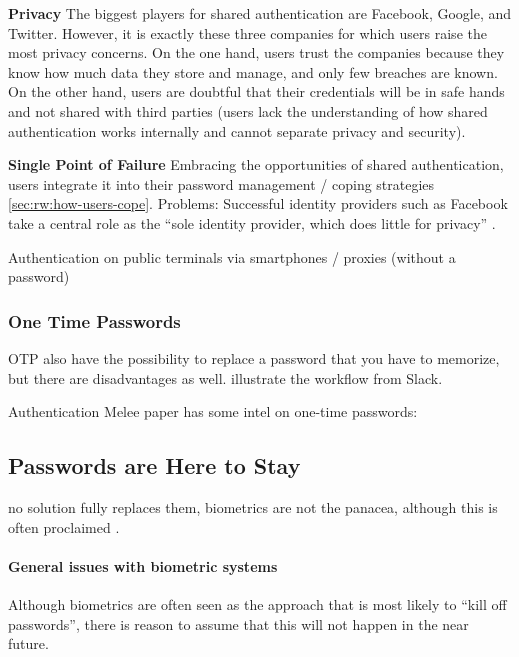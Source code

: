 \textbf{Privacy} The biggest players for shared authentication are Facebook, Google, and Twitter. However, it is exactly these three companies for which users raise the most privacy concerns. On the one hand, users trust the companies because they know how much data they store and manage, and only few breaches are known. On the other hand, users are doubtful that their credentials will be in safe hands and not shared with third parties (users lack the understanding of how shared authentication works internally and cannot separate privacy and security). 

\textbf{Single Point of Failure} Embracing the opportunities of shared authentication, users integrate it into their password management / coping strategies \ref{sec:rw:how-users-cope}. 
Problems: 
Successful identity providers such as Facebook take a central role as the ``sole identity provider, which does little for privacy'' \cite{Bonneau2015ImperfectAuthentication}.

	Authentication on public terminals via smartphones / proxies (without a password) \cite{Roalter2013SmartphoneProxy}

	
\subsubsection{One Time Passwords}

OTP also have the possibility to replace a password that you have to memorize, but there are disadvantages as well. 
illustrate the workflow from Slack.

Authentication Melee paper has some intel on one-time passwords: \cite{Ruoti2015AuthenticationMelee}


\subsection{Passwords are Here to Stay}\label{sec:rw:pws_are_here_to_stay}
no solution fully replaces them, biometrics are not the panacea, although this is often proclaimed \ar.

\paragraph{General issues with biometric systems}
Although biometrics are often seen as the approach that is most likely to ``kill off passwords'', there is reason to assume that this will not happen in the near future.
	
